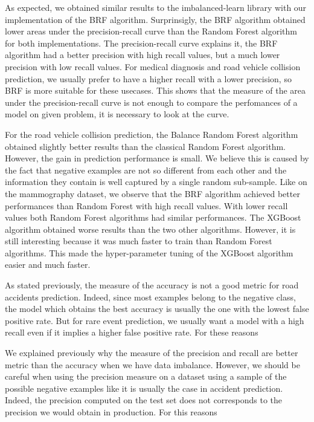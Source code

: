 \documentclass[conference]{IEEEtran}
\begin{document}
As expected, we obtained similar results to the imbalanced-learn library with our implementation of the BRF algorithm. Surprinsigly, the BRF algorithm obtained lower areas under the precision-recall curve than the Random Forest algorithm for both implementations. The precision-recall curve explains it, the BRF algorithm had a better precision with high recall values, but a much lower precision with low recall values. For medical diagnosis and road vehicle collision prediction, we usually prefer to have a higher recall with a lower precision, so BRF is more suitable for these usecases. This shows that the measure of the area under the precision-recall curve is not enough to compare the perfomances of a model on given problem, it is necessary to look at the curve. 

For the road vehicle collision prediction, the Balance Random Forest algorithm obtained slightly better results than the classical Random Forest algorithm. However, the gain in prediction performance is small. We believe this is caused by the fact that negative examples are not so different from each other and the information they contain is well captured by a single random sub-sample. Like on the mammography dataset, we observe that the BRF algorithm achieved better performances than Random Forest with high recall values. With lower recall values both Random Forest algorithms had similar performances. The XGBoost algorithm obtained worse results than the two other algorithms. However, it is still interesting because it was much faster to train than Random Forest algorithms. This made the hyper-parameter tuning of the XGBoost algorithm easier and much faster. 

As stated previously, the measure of the accuracy is not a good metric for road accidents prediction. Indeed, since most examples belong to the negative class, the model which obtains the best accuracy is usually the one with the lowest false positive rate. But for rare event prediction, we usually want a model with a high recall even if it implies a higher false positive rate. For these reasons

We explained previously why the measure of the precision and recall are better metric than the accuracy when we have data imbalance. However, we should be careful when using the precision measure on a dataset using a sample of the possible negative examples like it is usually the case in accident prediction. Indeed, the precision computed on the test set does not corresponds to the precision we would obtain in production.
For this reasons 
  
\end{document}
